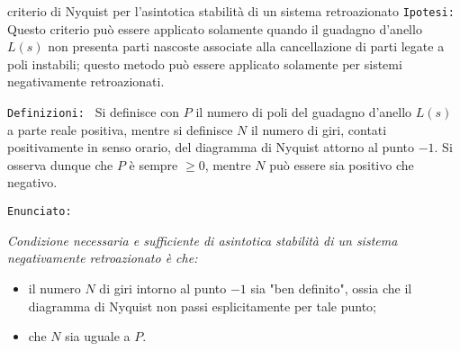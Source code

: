 		\begin{teorema}{criterio di Nyquist per l'asintotica stabilità di un sistema retroazionato}
			\texttt{Ipotesi: } Questo criterio può essere applicato solamente quando il guadagno d'anello $L(s)$ non presenta parti nascoste associate alla cancellazione di parti legate a poli instabili; questo metodo può essere applicato solamente per sistemi negativamente retroazionati.
			
			\vspace{3mm}
			\texttt{Definizioni: } Si definisce con $P$ il numero di poli del guadagno d'anello $L(s)$ a parte reale positiva, mentre si definisce $N$ il numero di giri, contati positivamente in senso orario, del diagramma di Nyquist attorno al punto $-1$. Si osserva dunque che $P$ è sempre $\geq 0$, mentre $N$ può essere sia positivo che negativo.
			
			\vspace{3mm}
			\texttt{Enunciato:} {\itshape  Condizione necessaria e sufficiente di asintotica stabilità di un sistema negativamente retroazionato è che:
			\begin{itemize}
				\item il numero $N$ di giri intorno al punto $-1$ sia "ben definito", ossia che il diagramma di Nyquist non passi esplicitamente per tale punto;
				\item che $N$ sia uguale a $P$.
		\end{itemize}}
		\end{teorema}
		
		
		
		
	
	
	
	
	
	